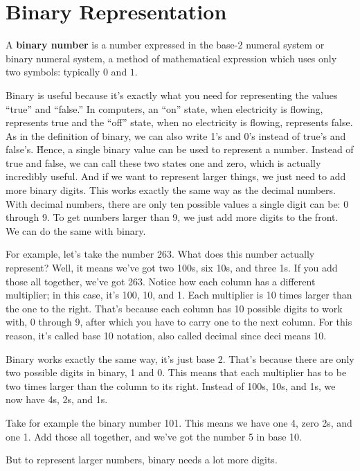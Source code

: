 \section{Binary Representation}

A \textbf{binary number} is a number expressed in the base-2 numeral system or binary numeral system, a method of
mathematical expression which uses only two symbols: typically $0$ and $1$.
\ed

Binary is useful because it's exactly what you need for representing the values ``true'' and ``false.'' In computers,
an ``on'' state, when electricity is flowing, represents true and the ``off'' state, when no electricity is flowing,
represents false. As in the definition of binary, we can also write 1's and 0's instead of true's and false's. \v

Hence, a single binary value can be used to represent a number. Instead of true and false, we can call these two
states one and zero, which is actually incredibly useful. And if we want to represent larger things, we just need to
add more binary digits. This works exactly the same way as the decimal numbers. With decimal numbers, there are only
ten possible values a single digit can be: 0 through 9. To get numbers larger than 9, we just add more digits to the
front. We can do the same with binary.

\be
For example, let's take the number 263. What does this number actually represent? Well, it means we've got two 100s,
six 10s, and three 1s. If you add those all together, we've got 263. Notice how each column has a different
multiplier; in this case, it's 100, 10, and 1. Each multiplier is 10 times larger than the one to the right. That's
because each column has 10 possible digits to work with, 0 through 9, after which you have to carry one to the next
column. For this reason, it's called base 10 notation, also called decimal since deci means 10.
\ee

Binary works exactly the same way, it's just base 2. That's because there are only two possible digits in binary, 1
and 0. This means that each multiplier has to be two times larger than the column to its right. Instead of 100s, 10s,
and 1s, we now have 4s, 2s, and 1s.

\be
Take for example the binary number 101. This means we have one 4, zero 2s, and one 1. Add those all together, and
we've got the number 5 in base 10.
\ee

But to represent larger numbers, binary needs a lot more digits.

